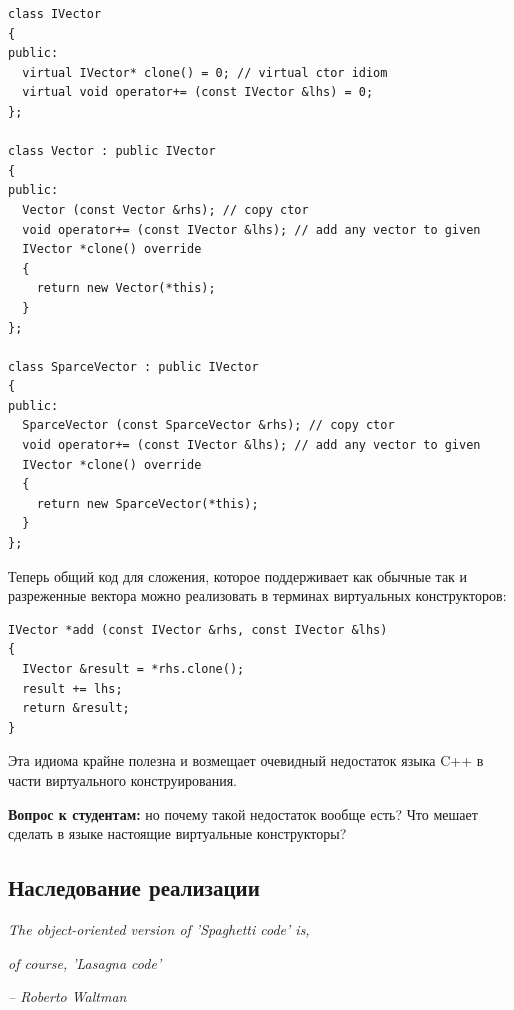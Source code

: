 \documentclass[a4paper,12pt,oneside]{article}
\newif\ifanswers
\begin{document}
\begin{lstlisting}
class IVector
{
public:
  virtual IVector* clone() = 0; // virtual ctor idiom
  virtual void operator+= (const IVector &lhs) = 0;
};

class Vector : public IVector
{
public: 
  Vector (const Vector &rhs); // copy ctor
  void operator+= (const IVector &lhs); // add any vector to given
  IVector *clone() override
  {
    return new Vector(*this);
  }
};

class SparceVector : public IVector
{
public: 
  SparceVector (const SparceVector &rhs); // copy ctor
  void operator+= (const IVector &lhs); // add any vector to given
  IVector *clone() override
  {
    return new SparceVector(*this);
  }
};
\end{lstlisting}

Теперь общий код для сложения, которое поддерживает как обычные так и разреженные вектора можно реализовать в терминах виртуальных конструкторов:

\begin{lstlisting}
IVector *add (const IVector &rhs, const IVector &lhs)
{
  IVector &result = *rhs.clone();
  result += lhs;
  return &result;
}
\end{lstlisting}

Эта идиома крайне полезна и возмещает очевидный недостаток языка C++ в части виртуального конструирования.

\textbf{Вопрос к студентам:} но почему такой недостаток вообще есть? Что мешает сделать в языке настоящие виртуальные конструкторы?

\ifanswers
Правильный ответ: именно конструктор делает ту работу, которая должна быть сделана чтобы заработал механизм виртуальных функций. Поэтому в конструкторе класса виртуальные вызовы работают как не виртуальные. Поэтому даже если бы можно было сделать конструктор виртуальным, его вызов все равно был бы вызовом невиртуальной функции.
\fi

\pagebreak
\subsection{Наследование реализации}\label{ImplInheritance}

\hfill\textit{The object-oriented version of 'Spaghetti code' is,}

\hfill\textit{of course, 'Lasagna code'}{\vspace{0.5em}}

\hfill\textit{-- Roberto Waltman}
\end{document}
